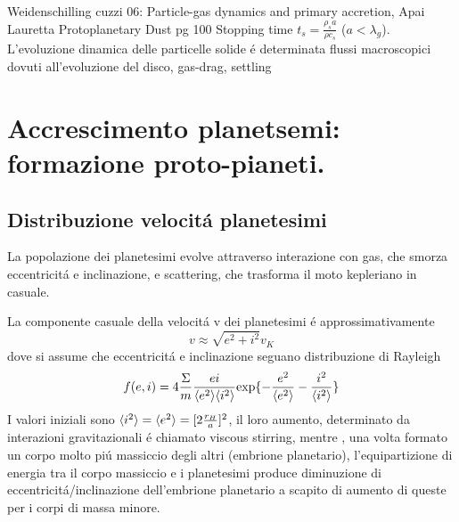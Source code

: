 \begin{workout}
Weidenschilling cuzzi 06: Particle-gas dynamics and primary accretion, Apai Lauretta Protoplanetary Dust pg 100
Stopping time $t_s=\frac{\rho_sa}{\rho c_s}$ ($a<\lambda_g$). L'evoluzione dinamica delle particelle solide \'e determinata flussi macroscopici dovuti all'evoluzione del disco, gas-drag, settling
\end{workout}

\section{Accrescimento planetsemi: formazione proto-pianeti.}

\subsection{Distribuzione velocit\'a planetesimi}
La popolazione dei planetesimi evolve attraverso interazione con gas, che smorza eccentricit\'a e inclinazione, e scattering, che trasforma il moto kepleriano in casuale.


La componente casuale della velocit\'a v dei planetesimi \'e approssimativamente
\begin{equation}
v\approx\sqrt{e^2+i^2}v_K
\end{equation}
dove si assume che eccentricit\'a e inclinazione seguano distribuzione di Rayleigh
\begin{equation}
f(e,i)=4\frac{\Sigma}{m}\frac{ei}{\langle e^2 \rangle\langle i^2 \rangle}\text{exp}\{-\frac{e^2}{\langle e^2 \rangle}-\frac{i^2}{\langle i^2 \rangle}\}
\end{equation}
I valori iniziali sono $\langle i^2 \rangle=\langle e^2 \rangle=[2\frac{r_H}{a}]^2$, il loro aumento, determinato da interazioni gravitazionali \'e chiamato viscous stirring, mentre , una volta formato un corpo molto pi\'u massiccio degli altri (embrione planetario), l'equipartizione di energia tra il corpo massiccio e i planetesimi produce diminuzione di eccentricit\'a/inclinazione dell'embrione planetario a scapito di aumento di queste per i corpi di massa minore.
 
